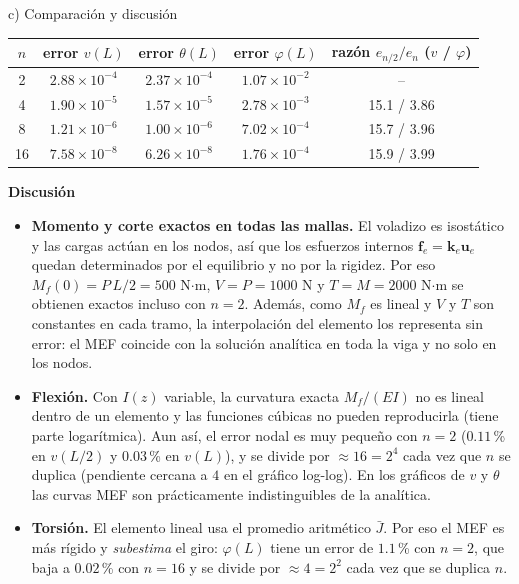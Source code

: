 \begin{desarrollo}{c) Comparación y discusión}
\begin{center}
\renewcommand{\arraystretch}{1.2}
\begin{tabular}{ccccc}
\hline
$n$ & error $v(L)$ & error $\theta(L)$ & error $\varphi(L)$ & razón $e_{n/2}/e_n$ ($v$ / $\varphi$)\\
\hline
2  & $2.88\times10^{-4}$ & $2.37\times10^{-4}$ & $1.07\times10^{-2}$ & -- \\
4  & $1.90\times10^{-5}$ & $1.57\times10^{-5}$ & $2.78\times10^{-3}$ & 15.1 / 3.86\\
8  & $1.21\times10^{-6}$ & $1.00\times10^{-6}$ & $7.02\times10^{-4}$ & 15.7 / 3.96\\
16 & $7.58\times10^{-8}$ & $6.26\times10^{-8}$ & $1.76\times10^{-4}$ & 15.9 / 3.99\\
\hline
\end{tabular}
\end{center}

\textbf{Discusión}
\begin{itemize}[itemsep=4pt]
    \item \textbf{Momento y corte exactos en todas las mallas.} El voladizo es
    isostático y las cargas actúan en los nodos, así que los esfuerzos
    internos $\mathbf{f}_e=\mathbf{k}_e\mathbf{u}_e$ quedan determinados por el
    equilibrio y no por la rigidez. Por eso $M_f(0)=P\,L/2=500$ N$\cdot$m,
    $V=P=1000$ N y $T=M=2000$ N$\cdot$m se obtienen exactos incluso con $n=2$.
    Además, como $M_f$ es lineal y $V$ y $T$ son constantes en cada tramo, la
    interpolación del elemento los representa sin error: el MEF coincide con
    la solución analítica en toda la viga y no solo en los nodos.

    \item \textbf{Flexión.} Con $I(z)$ variable, la curvatura exacta $M_f/(EI)$ no es lineal dentro de un elemento y las funciones cúbicas no pueden reproducirla (tiene parte logarítmica). Aun así, el error nodal es muy pequeño con $n=2$ ($0.11$\,\% en $v(L/2)$ y $0.03$\,\%
    en $v(L)$), y se divide por $\approx 16=2^4$ cada vez que $n$ se duplica
    (pendiente cercana a $4$ en el gráfico log-log). En los gráficos de $v$ y $\theta$ las
    curvas MEF son prácticamente indistinguibles de la analítica.

    \item \textbf{Torsión.} El elemento lineal
    usa el promedio aritmético $\bar J$. Por eso el MEF es más rígido y \emph{subestima} el giro:
    $\varphi(L)$ tiene un error de $1.1$\,\% con $n=2$, que baja a $0.02$\,\%
    con $n=16$ y se divide por $\approx 4=2^2$ cada vez que se duplica $n$.


\end{itemize}
\end{desarrollo}
